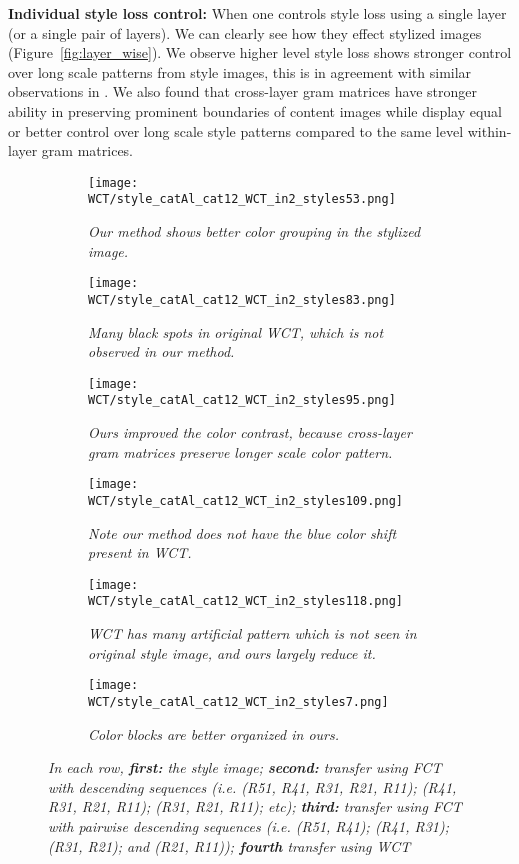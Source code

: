 \documentclass[runningheads]{llncs}
\begin{document}
{\bf Individual style loss control:} When one controls style loss using a single layer (or a single pair of layers). We can clearly see how they effect stylized images (Figure~\ref{fig:layer_wise}). We observe higher level style loss shows stronger control over long scale patterns from style images, this is in agreement with similar observations in \cite{gatys2016image}. We also found that cross-layer gram matrices have stronger ability in preserving prominent boundaries of content images while display equal or better control over long scale style patterns compared to the same level within-layer gram matrices.  
\begin{figure}[h]
  \centering
  \begin{subfigure}[b]{\linewidth}
    \texttt{[image: WCT/style\_catAl\_cat12\_WCT\_in2\_styles53.png]}
     \caption{\em Our method shows better color grouping in the stylized image.}
  \end{subfigure}
  \begin{subfigure}[b]{\linewidth}
    \texttt{[image: WCT/style\_catAl\_cat12\_WCT\_in2\_styles83.png]}
    \caption{\em  Many black spots in original WCT, which is not observed in our method.}
  \end{subfigure}
  \begin{subfigure}[b]{\linewidth}
    \texttt{[image: WCT/style\_catAl\_cat12\_WCT\_in2\_styles95.png]}
    \caption{\em  Ours improved the color contrast, because cross-layer gram matrices preserve longer scale color pattern.}
  \end{subfigure}
  \begin{subfigure}[b]{\linewidth}
    \texttt{[image: WCT/style\_catAl\_cat12\_WCT\_in2\_styles109.png]}
    \caption{\em Note our method does not have the blue color shift present in WCT.}
  \end{subfigure}
  \begin{subfigure}[b]{\linewidth}
    \texttt{[image: WCT/style\_catAl\_cat12\_WCT\_in2\_styles118.png]}
    \caption{\em WCT has many artificial pattern which is not seen in original style image, and ours largely reduce it.}
  \end{subfigure}
  \begin{subfigure}[b]{\linewidth}
    \texttt{[image: WCT/style\_catAl\_cat12\_WCT\_in2\_styles7.png]}
    \caption{\em Color blocks are better organized in ours.}
  \end{subfigure}
  \caption{\em In each row, {\bf first:} the style image; {\bf second:} transfer using FCT with descending sequences
    (i.e. (R51, R41, R31, R21, R11); (R41, R31, R21, R11); (R31, R21, R11); etc); {\bf third:} transfer using FCT with pairwise descending sequences (i.e. (R51, R41); (R41, R31); (R31, R21); and (R21, R11)); {\bf fourth} transfer using
    WCT \protect \cite{UST}
  \label{fig:WCT1}}
\end{figure}
\end{document}
